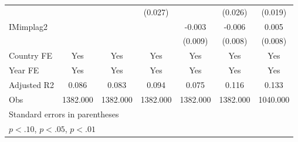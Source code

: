 \begin{table}[htbp]
{\begin{tabular}{l*{6}{c}}
                &                  &                  &  (0.027)         &                  &  (0.026)         &  (0.019)         \\
[1em]
IMimplag2       &                  &                  &                  &   -0.003         &   -0.006         &    0.005         \\
                &                  &                  &                  &  (0.009)         &  (0.008)         &  (0.008)         \\
\hline
Country FE      &\multicolumn{1}{c}{Yes}         &\multicolumn{1}{c}{Yes}         &\multicolumn{1}{c}{Yes}         &\multicolumn{1}{c}{Yes}         &\multicolumn{1}{c}{Yes}         &\multicolumn{1}{c}{Yes}         \\
Year FE         &\multicolumn{1}{c}{Yes}         &\multicolumn{1}{c}{Yes}         &\multicolumn{1}{c}{Yes}         &\multicolumn{1}{c}{Yes}         &\multicolumn{1}{c}{Yes}         &\multicolumn{1}{c}{Yes}         \\
Adjusted R2     &\multicolumn{1}{c}{0.086}         &\multicolumn{1}{c}{0.083}         &\multicolumn{1}{c}{0.094}         &\multicolumn{1}{c}{0.075}         &\multicolumn{1}{c}{0.116}         &\multicolumn{1}{c}{0.133}         \\
Obs             &\multicolumn{1}{c}{1382.000}         &\multicolumn{1}{c}{1382.000}         &\multicolumn{1}{c}{1382.000}         &\multicolumn{1}{c}{1382.000}         &\multicolumn{1}{c}{1382.000}         &\multicolumn{1}{c}{1040.000}         \\
\hline\hline
\multicolumn{7}{l}{\footnotesize Standard errors in parentheses}\\
\multicolumn{7}{l}{\footnotesize \sym{*} \(p<.10\), \sym{**} \(p<.05\), \sym{***} \(p<.01\)}\\
\end{tabular}}
\end{table}
